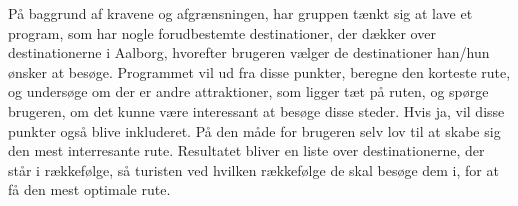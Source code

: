 På baggrund af kravene og afgrænsningen, har gruppen tænkt sig at lave et program, som har nogle forudbestemte destinationer, der dækker over destinationerne i Aalborg, hvorefter brugeren vælger de destinationer han/hun ønsker at besøge. Programmet vil ud fra disse punkter, beregne den korteste rute, og undersøge om der er andre attraktioner, som ligger tæt på ruten, og spørge brugeren, om det kunne være interessant at besøge disse steder. Hvis ja, vil disse punkter også blive inkluderet. På den måde for brugeren selv lov til at skabe sig den mest interresante rute. Resultatet bliver en liste over destinationerne, der står i rækkefølge, så turisten ved hvilken rækkefølge de skal besøge dem i, for at få den mest optimale rute.
